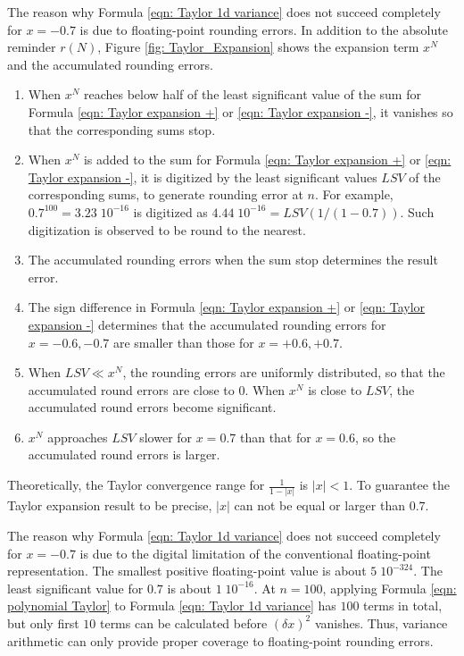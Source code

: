 \documentclass[twoside]{article}
\numberwithin{equation}{section}
\begin{document}
The reason why Formula \eqref{eqn: Taylor 1d variance} does not succeed completely for $x = -0.7$ is due to floating-point rounding errors.
In addition to  the absolute reminder $r(N)$, Figure \ref{fig: Taylor_Expansion} shows the expansion term $x^N$ and the accumulated rounding errors.
\begin{enumerate}
\item When $x^N$ reaches below half of the least significant value of the sum for Formula \eqref{eqn: Taylor expansion +} or \eqref{eqn: Taylor expansion -}, it vanishes so that the corresponding sums stop.

\item When $x^N$ is added to the sum for Formula \eqref{eqn: Taylor expansion +} or \eqref{eqn: Taylor expansion -}, it is digitized by the least significant values $LSV$ of the corresponding sums, to generate rounding error at $n$.
For example, $0.7^{100}=3.23\; 10^{-16}$ is digitized as $4.44\; 10^{-16} = LSV(1/(1 - 0.7))$.
Such digitization is observed to be round to the nearest.

\item The accumulated rounding errors when the sum stop determines the result error.

\item The sign difference in Formula \eqref{eqn: Taylor expansion +} or \eqref{eqn: Taylor expansion -} determines that the accumulated rounding errors for $x = -0.6, -0.7$ are smaller than those for $x = +0.6, +0.7$.

\item When $LSV \ll x^N$, the rounding errors are uniformly distributed, so that the accumulated round errors are close to $0$.
When $x^N$ is close to $LSV$, the accumulated round errors become significant.

\item $x^N$ approaches $LSV$ slower for $x = 0.7$ than that for $x = 0.6$, so the accumulated round errors is larger.

\end{enumerate}
Theoretically, the Taylor convergence range for $\frac{1}{1 - |x|}$ is $|x| < 1$.
To guarantee the Taylor expansion result to be precise, $|x|$ can not be equal or larger than $0.7$.

The reason why Formula \eqref{eqn: Taylor 1d variance} does not succeed completely for $x = -0.7$ is due to the digital limitation of the conventional floating-point representation.
The smallest positive floating-point value is about $5\; 10^{-324}$. 
The least significant value for $0.7$ is about $1\; 10^{-16}$.
At $n=100$, applying Formula \eqref{eqn: polynomial Taylor} to Formula \eqref{eqn: Taylor 1d variance} has $100$ terms in total, but only first $10$ terms can be calculated before $(\delta x)^2$ vanishes.
Thus, variance arithmetic can only provide proper coverage to floating-point rounding errors. 
\end{document}
